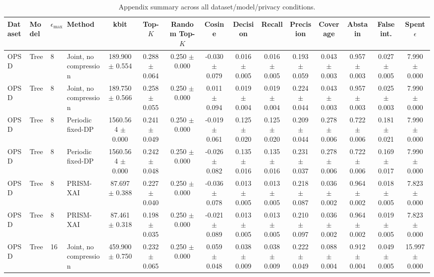 \begin{table}[t]
\caption{Appendix summary across all dataset/model/privacy conditions.}
\label{tab:appendix-conditions}
\centering
\scriptsize
\setlength{\tabcolsep}{2.5pt}
\begin{tabular}{llllccccccccccc}
\toprule
Dataset & Model & $\epsilon_{\max}$ & Method & kbit & Top-$K$ & Random Top-$K$ & Cosine & Decision & Recall & Precision & Coverage & Abstain & False int. & Spent $\epsilon$ \\
\midrule
OPSD & Tree & 8 & Joint, no compression & 189.900 $\pm$ 0.554 & 0.288 $\pm$ 0.064 & 0.250 $\pm$ 0.000 & -0.030 $\pm$ 0.079 & 0.016 $\pm$ 0.005 & 0.016 $\pm$ 0.005 & 0.193 $\pm$ 0.059 & 0.043 $\pm$ 0.003 & 0.957 $\pm$ 0.003 & 0.027 $\pm$ 0.005 & 7.990 $\pm$ 0.000 \\
OPSD & Tree & 8 & Joint, no compression & 189.750 $\pm$ 0.566 & 0.258 $\pm$ 0.055 & 0.250 $\pm$ 0.000 & 0.011 $\pm$ 0.094 & 0.019 $\pm$ 0.004 & 0.019 $\pm$ 0.004 & 0.224 $\pm$ 0.044 & 0.043 $\pm$ 0.003 & 0.957 $\pm$ 0.003 & 0.025 $\pm$ 0.003 & 7.990 $\pm$ 0.000 \\
OPSD & Tree & 8 & Periodic fixed-DP & 1560.564 $\pm$ 0.000 & 0.241 $\pm$ 0.049 & 0.250 $\pm$ 0.000 & -0.019 $\pm$ 0.061 & 0.125 $\pm$ 0.020 & 0.125 $\pm$ 0.020 & 0.209 $\pm$ 0.044 & 0.278 $\pm$ 0.006 & 0.722 $\pm$ 0.006 & 0.181 $\pm$ 0.021 & 7.990 $\pm$ 0.000 \\
OPSD & Tree & 8 & Periodic fixed-DP & 1560.564 $\pm$ 0.000 & 0.242 $\pm$ 0.048 & 0.250 $\pm$ 0.000 & -0.026 $\pm$ 0.082 & 0.135 $\pm$ 0.016 & 0.135 $\pm$ 0.016 & 0.231 $\pm$ 0.037 & 0.278 $\pm$ 0.006 & 0.722 $\pm$ 0.006 & 0.169 $\pm$ 0.017 & 7.990 $\pm$ 0.000 \\
OPSD & Tree & 8 & PRISM-XAI & 87.697 $\pm$ 0.388 & 0.227 $\pm$ 0.040 & 0.250 $\pm$ 0.000 & -0.036 $\pm$ 0.078 & 0.013 $\pm$ 0.005 & 0.013 $\pm$ 0.005 & 0.218 $\pm$ 0.087 & 0.036 $\pm$ 0.002 & 0.964 $\pm$ 0.002 & 0.018 $\pm$ 0.005 & 7.823 $\pm$ 0.000 \\
OPSD & Tree & 8 & PRISM-XAI & 87.461 $\pm$ 0.318 & 0.198 $\pm$ 0.035 & 0.250 $\pm$ 0.000 & -0.021 $\pm$ 0.089 & 0.013 $\pm$ 0.005 & 0.013 $\pm$ 0.005 & 0.210 $\pm$ 0.097 & 0.036 $\pm$ 0.002 & 0.964 $\pm$ 0.002 & 0.019 $\pm$ 0.005 & 7.823 $\pm$ 0.000 \\
OPSD & Tree & 16 & Joint, no compression & 459.900 $\pm$ 0.750 & 0.232 $\pm$ 0.065 & 0.250 $\pm$ 0.000 & 0.059 $\pm$ 0.048 & 0.038 $\pm$ 0.009 & 0.038 $\pm$ 0.009 & 0.222 $\pm$ 0.049 & 0.088 $\pm$ 0.004 & 0.912 $\pm$ 0.004 & 0.049 $\pm$ 0.005 & 15.997 $\pm$ 0.000 \\

\end{tabular}
\end{table}
